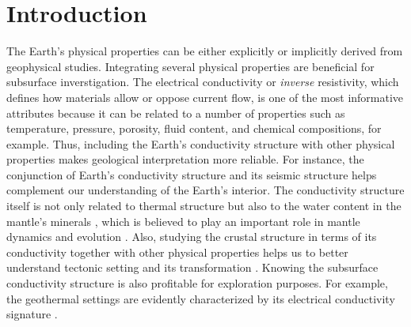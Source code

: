 
\renewcommand{\thisdir}{_content/intro}
\renewcommand{\figdir}{\thisdir/_fig}

\chapter{Introduction}



The Earth's physical properties can be either explicitly or implicitly derived from geophysical studies.
%
Integrating several physical properties are beneficial for subsurface inverstigation.
	The electrical conductivity or \emph{inverse} resistivity, which defines how materials allow or oppose current flow, is one of the most informative attributes because it can be related to a number of properties such as temperature, pressure, porosity, fluid content, and chemical compositions, for example.
	Thus, including the Earth's conductivity structure with other physical properties makes geological interpretation more reliable.
	For instance, the conjunction of Earth's conductivity structure and its seismic structure helps complement our understanding of the Earth's interior. The conductivity structure itself is not only related to thermal structure but also to the water content in the mantle's minerals \citep[e.g.,][]{karato1990a, yoshino2006a, wang2006a}, which is believed to play an important role in mantle dynamics and evolution \citep[e.g.,][]{kelbert2009a, baba2010a, shimizu2010b}.  
	Also, studying the crustal structure in terms of its conductivity together with other physical properties helps us to better understand tectonic setting and its transformation \citep[e.g.,][]{muller2009a, unsworth2010a,  boonchaisuk2013a}.
	Knowing the subsurface conductivity structure is also profitable for exploration purposes. 
	For example, the geothermal settings are evidently characterized by its electrical conductivity signature \citep[see a review paper by][and references therein]{munoz2013a}.

